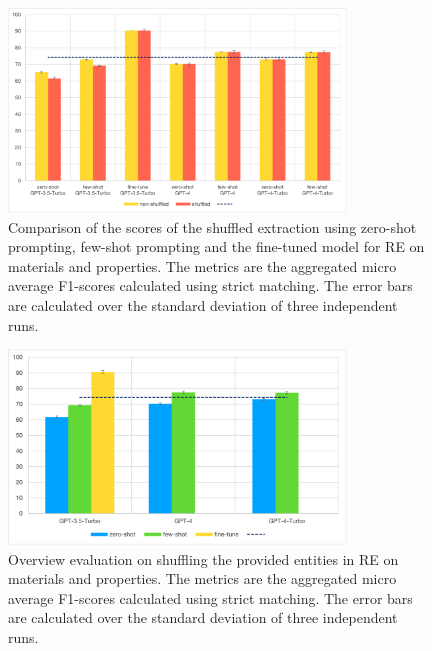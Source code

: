 \begin{figure}[htbp]
  \centering
  \includegraphics[width=0.8\textwidth]{figures/re-eval-all} 
  \caption{Comparison of the scores of the shuffled extraction using zero-shot prompting, few-shot prompting and the fine-tuned model for RE on materials and properties. The metrics are the aggregated micro average F1-scores calculated using strict matching. The error bars are calculated over the standard deviation of three independent runs.}
  \label{fig:re-eval-all}
\end{figure}

\begin{figure}[htbp]
  \centering
  \includegraphics[width=0.8\textwidth]{figures/re-eval-shuffled-all} 
  \caption{Overview evaluation on shuffling the provided entities in RE on materials and properties. The metrics are the aggregated micro average F1-scores calculated using strict matching. The error bars are calculated over the standard deviation of three independent runs.}
  \label{fig:re-eval-shuffled-all}
\end{figure}

